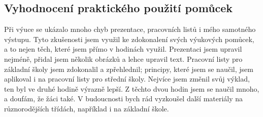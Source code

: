 \subsection{Vyhodnocení praktického použití pomůcek}
{Při výuce se ukázalo mnoho chyb prezentace, pracovních listů i mého samotného výstupu. Tyto zkušenosti jsem využil ke zdokonalení svých výukových pomůcek, a to nejen těch, které jsem přímo v hodinách využil.}\odst
{Prezentaci jsem upravil nejméně, přidal jsem několik obrázků a lehce upravil text. Pracovní listy pro základní školy jsem zdokonalil a zpřehlednil; principy, které jsem se naučil, jsem aplikoval i na pracovní listy pro střední školy. Nejvíce jsem změnil svůj výklad, ten byl ve druhé hodině výrazně lepší.}\odst
{Z těchto dvou hodin jsem se naučil mnoho, a doufám, že žáci také. V budoucnosti bych rád vyzkoušel další materiály na různorodějších třídách, například i na základní škole.}
\newpage
